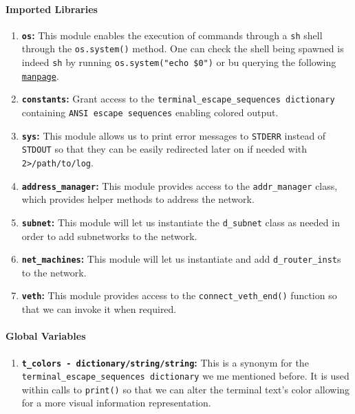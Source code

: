     \paragraph{Imported Libraries}
        \begin{enumerate}
            \item \textbf{\texttt{os}:} This module enables the execution of commands through a \texttt{sh} shell through the \texttt{os.system()} method. One can check the shell being spawned is indeed \texttt{sh} by running \texttt{\allowbreak os.system("echo \$0")} or bu querying the following \href{https://linux.die.net/man/3/system}{\texttt{manpage}}.
            \item \textbf{\texttt{constants}:} Grant access to the \texttt{\allowbreak terminal\_escape\_sequences dictionary} containing \texttt{ANSI escape sequences} enabling colored output.
            \item \textbf{\texttt{sys}:} This module allows us to print error messages to \texttt{STDERR} instead of \texttt{STDOUT} so that they can be easily redirected later on if needed with \texttt{2>/path/to/log}.
            \item \textbf{\texttt{address\_manager}:} This module provides access to the \texttt{addr\_manager} class, which provides helper methods to address the network.
            \item \textbf{\texttt{subnet}:} This module will let us instantiate the \texttt{d\_subnet} class as needed in order to add subnetworks to the network.
            \item \textbf{\texttt{net\_machines}:} This module will let us instantiate and add \texttt{d\_router\_inst}s to the network.
            \item \textbf{\texttt{veth}:} This module provides access to the \texttt{connect\_veth\_end()} function so that we can invoke it when required.
        \end{enumerate}

    \paragraph{Global Variables}
        \begin{enumerate}
            \item \textbf{\texttt{\allowbreak t\_colors - dictionary/string/string}:} This is a synonym for the \texttt{\allowbreak terminal\_escape\_sequences dictionary} we me mentioned before. It is used within calls to \texttt{print()} so that we can alter the terminal text's color allowing for a more visual information representation.
        \end{enumerate}

